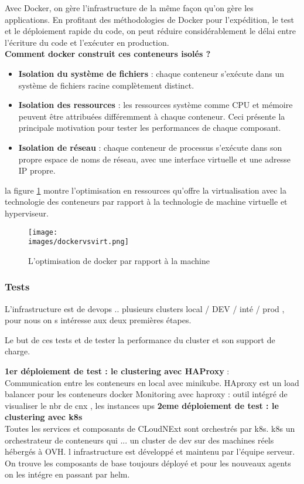     Avec Docker, on gère l’infrastructure de la même façon qu’on gère les applications.
    En profitant des méthodologies de Docker pour l’expédition, le test et le déploiement rapide
    du code, on peut réduire considérablement le délai entre l’écriture du code et l’exécuter en
    production.\\
    \textbf{Comment docker construit ces conteneurs isolés ?} \\
    \begin{itemize}
        \item \textbf{Isolation du système de fichiers} : chaque conteneur s’exécute dans un système de fichiers
        racine complètement distinct.
        \item \textbf{Isolation des ressources} : les ressources système comme CPU et mémoire peuvent être
        attribuées différemment à chaque conteneur.  Ceci présente la principale motivation pour tester les performances de chaque composant.
        \item \textbf{Isolation de réseau}  : chaque conteneur de processus s’exécute dans son propre espace de
        noms de réseau, avec une interface virtuelle et une adresse IP propre.
    \end{itemize}

    la figure \ref{fig:docker} montre l’optimisation en ressources qu’offre la virtualisation avec la technologie
    des conteneurs par rapport à la technologie de machine virtuelle et hyperviseur.

    \begin{figure}[ht]
        \centering
        \texttt{[image: \\images/dockervsvirt.png]}
        \caption{L'optimisation de docker par rapport à la machine }
        \label{fig:docker}
    \end{figure}
    \break

    \subsubsection{Tests}
    L'infrastructure est de devops .. plusieurs clusters 
    local / DEV / inté / prod , pour nous on s intéresse aux deux premières étapes. 

    Le but de ces tests et de tester la performance du cluster et son support de charge.

    \textbf{1er déploiement de test : le clustering avec HAProxy } :\\
    Communication entre les conteneurs en local avec minikube. 
    HAproxy est un load balancer pour les conteneurs docker
    Monitoring avec haproxy : outil intégré de visualiser le nbr de cnx , les instances ups
    \textbf{2eme déploiement de test : le clustering avec \gls{k8s} }\\
    Toutes les services et composants de CLoudNExt sont orchestrés par k8s.
    \gls{k8s} un  orchestrateur de conteneurs qui ... 
    un cluster de dev sur des machines réels hébergés à OVH. 
    l infrastructure est développé et maintenu par l'équipe serveur. 
    On trouve les composants de base toujours déployé et pour les nouveaux agents on les intégre en passant par helm.  

